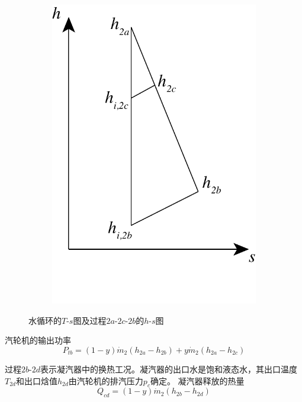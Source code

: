 \begin{figure}[htbp]
\begin{subfigure}[b]{0.28\columnwidth}
	\includegraphics[width = \columnwidth]{fig/SteamTurbine_hs.pdf}
	\caption{}\label{fig:SteamTurbine_hs}
	\end{subfigure}
	
	\caption{水循环的$T$-$s$图及过程$2a$-$2c$-$2b$的$h$-$s$图}\label{fig:SteamTurbine_hs_p}
\end{figure}

  汽轮机的输出功率
  \begin{equation}
  P_{tb}=\left(1-y\right)\dot{m}_{2}\left(h_{2a}-h_{2b}\right)+y\dot{m}_{2}\left(h_{2a}-h_{2c}\right)
  \end{equation}
 
  
  过程$2b$-$2d$表示凝汽器中的换热工况。凝汽器的出口水是饱和液态水，其出口温度$T_{2d}$和出口焓值$h_{2d}$由汽轮机的排汽压力$p_c$确定。
  凝汽器释放的热量
  \begin{equation}
      Q_{cd} = (1-y)\dot{m}_2 (h_{2b} - h_{2d})
\end{equation}

